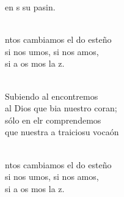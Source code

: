 \documentclass[12pt]{article}
\begin{document}
\begin{multicols*}{2}
\begin{cancion}
	en s su pasin.\\\jump\\
	\begin{chorus}%
	ntos cambiamos el do esteño\\
	si nos umos, si nos amos,\\
	si a os mos la z.\\
	\end{chorus}%
	\jump\\
	Subiendo al  encontremos\\
	al Dios que bia nuestro coran; \\
	sólo en elr comprendemos\\
	que nuestra a traiciosu vocaón\\\jump\\
	\begin{chorus}%
	ntos cambiamos el do esteño\\
	si nos umos, si nos amos,\\
	si a os mos la z.\\
	\end{chorus}%
	\jump\\
\end{cancion}%


\end{multicols*}
\end{document}
